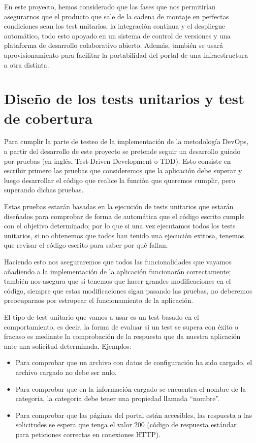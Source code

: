 \bigskip
En este proyecto, hemos considerado que las fases que nos permitirían asegurarnos que el producto que sale de la cadena de 
montaje en perfectas condiciones sean los test unitarios, la integración continua y el despliegue automático, todo esto apoyado
en un sistema de control de versiones y una plataforma de desarrollo colaborativo abierto. Además, también se usará
aprovisionamiento para facilitar la portabilidad del portal de una infraestructura a otra distinta. 

\section{Diseño de los tests unitarios y test de cobertura}

Para cumplir la parte de testeo de la implementación de la metodología DevOps, a partir del desarrollo de este proyecto se 
pretende seguir un desarrollo guiado por pruebas (en inglés, Test-Driven Development o TDD). Esto consiste en escribir primero
las pruebas que consideremos que la aplicación debe superar y luego desarrollar el código que realice la función que queremos
cumplir, pero superando dichas pruebas. 

\bigskip
Estas pruebas estarán basadas en la ejecución de tests unitarios que estarán diseñados para comprobar de forma de automática
que el código escrito cumple con el objetivo determinado; por lo que si una vez ejecutamos todos los tests unitarios, si no
obtenemos que todos han tenido una ejecución exitosa, tenemos que revisar el código escrito para saber por qué fallan.

\bigskip
Haciendo esto nos aseguraremos que todos las funcionalidades que vayamos añadiendo a la implementación de la aplicación
funcionarán correctamente; también nos asegura que si tenemos que hacer grandes modificaciones en el código, siempre que estas
modificaciones sigan pasando las pruebas, no deberemos preocuparnos por estropear el funcionamiento de la aplicación.

\bigskip
El tipo de test unitario que vamos a usar es un test basado en el comportamiento, es decir, la forma de evaluar si un test
se supera con éxito o fracaso es mediante la comprobación de la respuesta que da nuestra aplicación ante una solicitud 
determinada. Ejemplos:

\begin{itemize}
 \item Para comprobar que un archivo con datos de configuración ha sido cargado, el archivo cargado no debe ser nulo.
 \item Para comprobar que en la información cargado se encuentra el nombre de la categoria, la categoria debe tener una 
 propiedad llamada ``nombre''.
 \item Para comprobar que las páginas del portal están accesibles, las respuesta a las solicitudes se espera que tenga el valor
 200 (código de respuesta estándar para peticiones correctas en conexiones HTTP).
\end{itemize}

